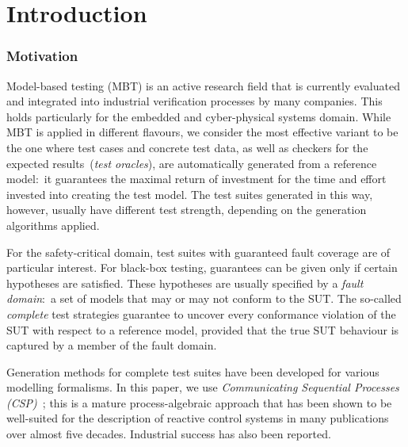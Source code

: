 
\section{Introduction}
\label{sec:intro}


\subsubsection*{Motivation}

Model-based testing (MBT) is an  active research field that is currently
evaluated and integrated into industrial verification processes by many
companies. This holds particularly for the embedded and cyber-physical
systems domain. While MBT is applied in different flavours, we consider the
most effective variant to be the one where test cases and concrete test data,
as well as checkers for the expected results~(\emph{test oracles}), are
automatically generated from a reference model:~it guarantees the maximal
return of investment for the time and effort invested into creating the test
model. The test suites generated in this way, however, usually have different
test strength, depending on the generation algorithms applied.

For the safety-critical domain, test suites with guaranteed fault coverage
are of particular interest. For black-box testing, guarantees can be given
only if certain hypotheses are satisfied. These hypotheses are usually
specified by a \emph{fault domain}:~a set of models that may or may not
conform to the SUT. The so-called \emph{complete} test strategies guarantee
to uncover every conformance violation of the SUT with respect to a reference
model, provided that the true SUT behaviour is captured by a member of the
fault domain.

Generation methods for complete test suites have been developed for various
modelling formalisms. In this paper, we use \emph{Communicating Sequential
Processes (CSP)}~\cite{Hoare:1985:CSP:3921,Roscoe2010}; this is a mature
process-algebraic approach that has been shown to be well-suited for the
description of reactive control systems in many publications over almost five
decades. Industrial success has also been reported.


